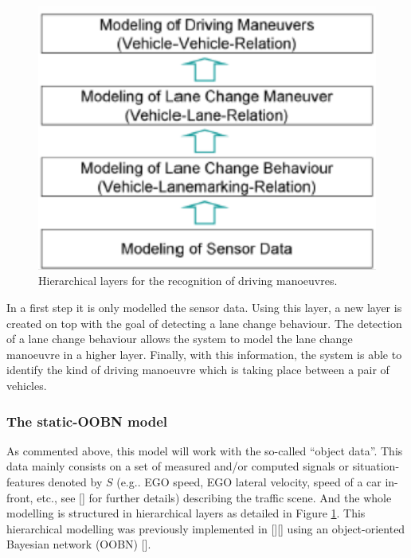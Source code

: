 \begin{figure}
\begin{center}
\includegraphics[scale=0.35]{./figures/DaimlerHierarchicalModelling}
\caption{\label{Figure:DaimlerHierarchicalModelling} Hierarchical layers for the recognition of driving manoeuvres.}
\end{center}
\end{figure}

In a first step it is only modelled the sensor data. Using this layer, a new layer is created on top with the goal of detecting a lane change behaviour. The detection of a lane change behaviour allows the system to model the lane change manoeuvre in a higher layer. Finally, with this information, the system is able to identify the kind of driving manoeuvre which is taking place between a pair of vehicles. 



\subsubsection*{The static-OOBN model}

As commented above, this model will work with the so-called ``object data''. This data mainly consists on a set of measured and/or computed signals or situation-features denoted by $S$ (e.g.. EGO speed, EGO lateral velocity, speed of a car in-front, etc., see [] for further details) describing the traffic scene. And the whole modelling is structured in hierarchical layers as detailed in Figure \ref{Figure:DaimlerHierarchicalModelling}. This hierarchical modelling was previously implemented in [][] using an object-oriented Bayesian network (OOBN) []. 


